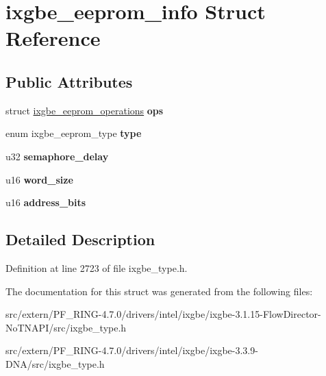 \hypertarget{structixgbe__eeprom__info}{
\section{ixgbe\_\-eeprom\_\-info Struct Reference}
\label{structixgbe__eeprom__info}
}
\subsection*{Public Attributes}
\begin{DoxyCompactItemize}
\item 
\hypertarget{structixgbe__eeprom__info_a6afddb88f5d71aa69d6170121bc5fc52}{
struct \hyperlink{structixgbe__eeprom__operations}{ixgbe\_\-eeprom\_\-operations} {\bfseries ops}}
\label{structixgbe__eeprom__info_a6afddb88f5d71aa69d6170121bc5fc52}

\item 
\hypertarget{structixgbe__eeprom__info_a5ba4df46e078c9bce892646abdb3615e}{
enum ixgbe\_\-eeprom\_\-type {\bfseries type}}
\label{structixgbe__eeprom__info_a5ba4df46e078c9bce892646abdb3615e}

\item 
\hypertarget{structixgbe__eeprom__info_af7604f17b9243062c57292520a7a38be}{
u32 {\bfseries semaphore\_\-delay}}
\label{structixgbe__eeprom__info_af7604f17b9243062c57292520a7a38be}

\item 
\hypertarget{structixgbe__eeprom__info_ae5db6a6cab553908e85dd63ebb3bbf7a}{
u16 {\bfseries word\_\-size}}
\label{structixgbe__eeprom__info_ae5db6a6cab553908e85dd63ebb3bbf7a}

\item 
\hypertarget{structixgbe__eeprom__info_af270d8ba981b241b8bf9d709919248f3}{
u16 {\bfseries address\_\-bits}}
\label{structixgbe__eeprom__info_af270d8ba981b241b8bf9d709919248f3}

\end{DoxyCompactItemize}


\subsection{Detailed Description}


Definition at line 2723 of file ixgbe\_\-type.h.



The documentation for this struct was generated from the following files:\begin{DoxyCompactItemize}
\item 
src/extern/PF\_\-RING-\/4.7.0/drivers/intel/ixgbe/ixgbe-\/3.1.15-\/FlowDirector-\/NoTNAPI/src/ixgbe\_\-type.h\item 
src/extern/PF\_\-RING-\/4.7.0/drivers/intel/ixgbe/ixgbe-\/3.3.9-\/DNA/src/ixgbe\_\-type.h\end{DoxyCompactItemize}
